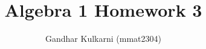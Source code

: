 \documentclass{article}
\title{Algebra 1 Homework 3} %
\author{Gandhar Kulkarni (mmat2304)} %
\date{} %
\begin{document}
\maketitle %


\section{} %

\section{} %

\section{} %

\section{} %

\section{} %

\section{} %

\section{} %

\section{} %

\section{} %

\section{} %

\section{} %
\end{document}
